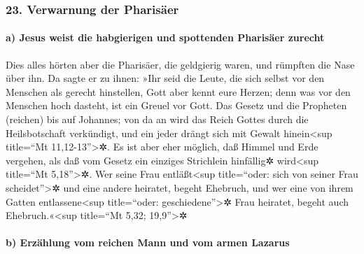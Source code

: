 \hypertarget{verwarnung-der-pharisuxe4er}{%
\subsubsection{23. Verwarnung der
Pharisäer}\label{verwarnung-der-pharisuxe4er}}

\hypertarget{a-jesus-weist-die-habgierigen-und-spottenden-pharisuxe4er-zurecht}{%
\paragraph{a) Jesus weist die habgierigen und spottenden Pharisäer
zurecht}\label{a-jesus-weist-die-habgierigen-und-spottenden-pharisuxe4er-zurecht}}

 Dies alles hörten aber die Pharisäer, die geldgierig
waren, und rümpften die Nase über ihn.  Da sagte er zu
ihnen: »Ihr seid die Leute, die sich selbst vor den Menschen als gerecht
hinstellen, Gott aber kennt eure Herzen; denn was vor den Menschen hoch
dasteht, ist ein Greuel vor Gott.  Das Gesetz und die
Propheten (reichen) bis auf Johannes; von da an wird das Reich Gottes
durch die Heilsbotschaft verkündigt, und ein jeder drängt sich mit
Gewalt hinein\textless sup title=``Mt 11,12-13''\textgreater✲.
 Es ist aber eher möglich, daß Himmel und Erde vergehen,
als daß vom Gesetz ein einziges Strichlein hinfällig✲ wird\textless sup
title=``Mt 5,18''\textgreater✲.  Wer seine Frau
entläßt\textless sup title=``oder: sich von seiner Frau
scheidet''\textgreater✲ und eine andere heiratet, begeht Ehebruch, und
wer eine von ihrem Gatten entlassene\textless sup title=``oder:
geschiedene''\textgreater✲ Frau heiratet, begeht auch
Ehebruch.«\textless sup title=``Mt 5,32; 19,9''\textgreater✲

\hypertarget{b-erzuxe4hlung-vom-reichen-mann-und-vom-armen-lazarus}{%
\paragraph{b) Erzählung vom reichen Mann und vom armen
Lazarus}\label{b-erzuxe4hlung-vom-reichen-mann-und-vom-armen-lazarus}}

